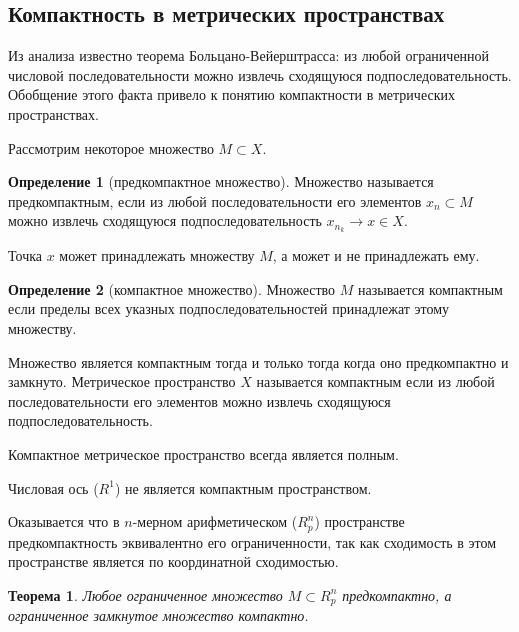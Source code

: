 \documentclass[14pt,a4paper]{extarticle}
\newtheorem{theorem}{Теорема}[section]
\theoremstyle{definition}
\newtheorem{definition}{Определение}[section]
\theoremstyle{remark}
\renewcommand{\[}{\begin{dmath*}[compact]}
\renewcommand{\]}{\end{dmath*}}
\begin{document}
\subsection{Компактность в метрических пространствах}

Из анализа известно теорема Больцано-Вейерштрасса:
из любой ограниченной числовой последовательности можно извлечь
сходящуюся подпоследовательность.
Обобщение этого факта привело к понятию компактности
в метрических пространствах.

Рассмотрим некоторое множество $M \subset X$.

\begin{definition}[предкомпактное множество]
  Множество называется предкомпактным,
  если из любой последовательности его элементов ${x_n} \subset M$
  можно извлечь сходящуюся подпоследовательность $x_{n_k} \to x \in X$.
\end{definition}

Точка $x$ может принадлежать множеству $M$, а может и не принадлежать ему.

\begin{definition}[компактное множество]
  Множество $M$ называется компактным если пределы всех указных
  подпоследовательностей принадлежат этому множеству.
\end{definition}

Множество является компактным тогда и только тогда когда оно
предкомпактно и замкнуто.
Метрическое пространство $X$ называется компактным если из любой
последовательности его элементов можно извлечь сходящуюся подпоследовательность.

Компактное метрическое пространство всегда является полным.

Числовая ось ($R^1$) не является компактным пространством. %


Оказывается что в $n$-мерном арифметическом ($R_p^n$) пространстве
предкомпактность эквивалентно его ограниченности,
так как сходимость в этом пространстве является по координатной сходимостью.

\begin{theorem}
  Любое ограниченное множество $M \subset R_p^n$ предкомпактно,
  а ограниченное замкнутое множество компактно.
\end{theorem}
\end{document}
